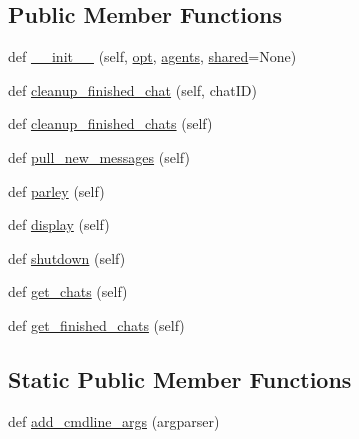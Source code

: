 \subsection*{Public Member Functions}
\begin{DoxyCompactItemize}
\item 
def \hyperlink{classprojects_1_1convai_1_1convai__world_1_1ConvAIWorld_abe0fa741d2ed06b8222ef930e1f7ab24}{\+\_\+\+\_\+init\+\_\+\+\_\+} (self, \hyperlink{classparlai_1_1core_1_1worlds_1_1World_a3640d92718acd3e6942a28c1ab3678bd}{opt}, \hyperlink{classparlai_1_1core_1_1worlds_1_1World_a728f75194cc26ea4035047c46cf62608}{agents}, \hyperlink{classprojects_1_1convai_1_1convai__world_1_1ConvAIWorld_a77e455138f285c6edaf494890a5dc774}{shared}=None)
\item 
def \hyperlink{classprojects_1_1convai_1_1convai__world_1_1ConvAIWorld_a9c8d56249c8e47e399f1e5a5eda5193a}{cleanup\+\_\+finished\+\_\+chat} (self, chat\+ID)
\item 
def \hyperlink{classprojects_1_1convai_1_1convai__world_1_1ConvAIWorld_a76d9656d3eb3a2a6646d61af69044be1}{cleanup\+\_\+finished\+\_\+chats} (self)
\item 
def \hyperlink{classprojects_1_1convai_1_1convai__world_1_1ConvAIWorld_ae915e7b5fafab4ea517fb30be05565b4}{pull\+\_\+new\+\_\+messages} (self)
\item 
def \hyperlink{classprojects_1_1convai_1_1convai__world_1_1ConvAIWorld_a0302226c1191e53e695e6627a68dd51d}{parley} (self)
\item 
def \hyperlink{classprojects_1_1convai_1_1convai__world_1_1ConvAIWorld_a0fab2b57d8eb4f4e9329c43d9a223ff4}{display} (self)
\item 
def \hyperlink{classprojects_1_1convai_1_1convai__world_1_1ConvAIWorld_a4a87579d3693ce3e07f940b66567a7d3}{shutdown} (self)
\item 
def \hyperlink{classprojects_1_1convai_1_1convai__world_1_1ConvAIWorld_a1c2a2ebebc08b1283d51defc4e4406cf}{get\+\_\+chats} (self)
\item 
def \hyperlink{classprojects_1_1convai_1_1convai__world_1_1ConvAIWorld_aa6854c9be7ee2f022d9ddefa448b7f39}{get\+\_\+finished\+\_\+chats} (self)
\end{DoxyCompactItemize}
\subsection*{Static Public Member Functions}
\begin{DoxyCompactItemize}
\item 
def \hyperlink{classprojects_1_1convai_1_1convai__world_1_1ConvAIWorld_afa6808254f400537a59fdd19d3574838}{add\+\_\+cmdline\+\_\+args} (argparser)
\end{DoxyCompactItemize}
